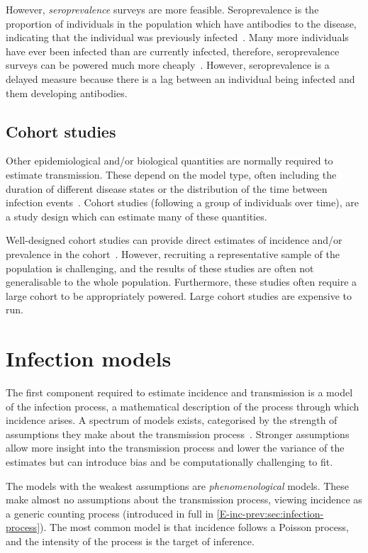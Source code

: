 \documentclass[thesis.tex]{subfiles}
\begin{document}
However, \emph{seroprevalence} surveys are more feasible.
Seroprevalence is the proportion of individuals in the population which have antibodies to the disease, indicating that the individual was previously infected~\autocite{cdcSeroprevalence}.
Many more individuals have ever been infected than are currently infected, therefore, seroprevalence surveys can be powered much more cheaply~\autocite{wuSeroprevSimulation}.
However, seroprevalence is a delayed measure because there is a lag between an individual being infected and them developing antibodies.

\subsection{Cohort studies}

Other epidemiological and/or biological quantities are normally required to estimate transmission.
These depend on the model type, often including the duration of different disease states or the distribution of the time between infection events~\autocite{wallingaGI,dankwaStructural}.
Cohort studies (following a group of individuals over time), are a study design which can estimate many of these quantities.

Well-designed cohort studies can provide direct estimates of incidence and/or prevalence in the cohort~\autocite[chapter 7]{lashModern}.
However, recruiting a representative sample of the population is challenging, and the results of these studies are often not generalisable to the whole population.
Furthermore, these studies often require a large cohort to be appropriately powered.
Large cohort studies are expensive to run.

\section{Infection models}

The first component required to estimate incidence and transmission is a model of the infection process, a mathematical description of the process through which incidence arises.
A spectrum of models exists, categorised by the strength of assumptions they make about the transmission process~\autocite{beckerCOVIDmodels}.
Stronger assumptions allow more insight into the transmission process and lower the variance of the estimates but can introduce bias and be computationally challenging to fit.

The models with the weakest assumptions are \emph{phenomenological} models.
These make almost no assumptions about the transmission process, viewing incidence as a generic counting process (introduced in full in \cref{E-inc-prev:sec:infection-process}).
The most common model is that incidence follows a Poisson process, and the intensity of the process is the target of inference.
\end{document}
